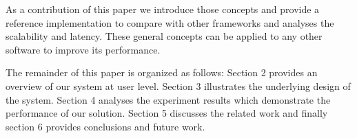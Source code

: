 As a contribution of this paper we introduce those concepts and provide a reference implementation to compare with other frameworks and analyses the scalability and latency. These general concepts can be applied to any other software to improve its performance. 

The remainder of this paper is organized as follows: Section 2 provides an overview of our system at user level. Section 3 illustrates the underlying design of the system. Section 4 analyses the experiment results which demonstrate the performance of our solution. Section 5 discusses the related work and finally section 6 provides conclusions and future work.
